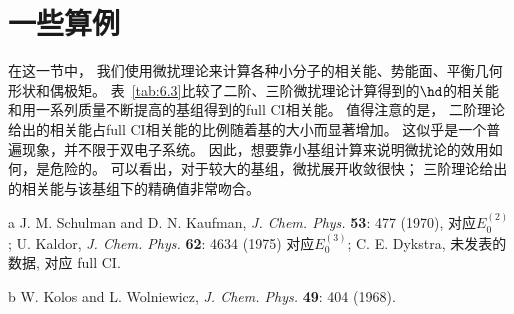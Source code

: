 \section{一些算例}
在这一节中，
我们使用微扰理论来计算各种小分子的相关能、势能面、平衡几何形状和偶极矩。
表~\autoref{tab:6.3}比较了二阶、三阶微扰理论计算得到的$\hd$的相关能和用一系列质量不断提高的基组得到的full CI相关能。
值得注意的是，
二阶理论给出的相关能占full CI相关能的比例随着基的大小而显著增加。
这似乎是一个普遍现象，并不限于双电子系统。
因此，想要靠小基组计算来说明微扰论的效用如何，是危险的。
可以看出，对于较大的基组，微扰展开收敛很快；
三阶理论给出的相关能与该基组下的精确值非常吻合。
\begin{table}[H]
	\centering
	\caption{$R=1.4$时$\hd$的关联能(a.u.)}
	\begin{threeparttable}
		\begin{tablenotes}
			\item[a] J. M. Schulman and D. N. Kaufman, \textit{J. Chem. Phys.} \textbf{53}: 477 (1970), 对应$E_0^{(2)}$; U. Kaldor, \textit{J. Chem. Phys.} \textbf{62}: 4634 (1975) 对应$E_0^{(3)}$; C. E. Dykstra, 未发表的数据, 对应 full CI.
			\item[b] W. Kolos and L. Wolniewicz, \textit{J. Chem. Phys.} \textbf{49}: 404 (1968).
		\end{tablenotes}
	\end{threeparttable}
	\label{tab:6.3}
\end{table}
